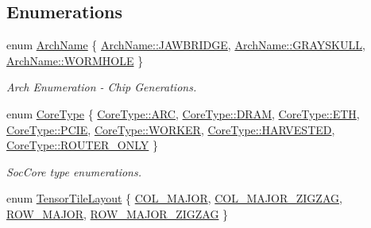 \subsection*{Enumerations}
\begin{DoxyCompactItemize}
\item 
enum \hyperlink{namespacellk_adb2574c7c85c75a2dfaf60853d0863d2}{Arch\+Name} \{ \hyperlink{namespacellk_adb2574c7c85c75a2dfaf60853d0863d2afedde270cf558ea8607564b045a78337}{Arch\+Name\+::\+J\+A\+W\+B\+R\+I\+D\+GE}, 
\hyperlink{namespacellk_adb2574c7c85c75a2dfaf60853d0863d2a876acd7fc1a65f2786b4d75eeed39cbb}{Arch\+Name\+::\+G\+R\+A\+Y\+S\+K\+U\+LL}, 
\hyperlink{namespacellk_adb2574c7c85c75a2dfaf60853d0863d2ab7cfd894e8bd0e909309ff64bb805fa2}{Arch\+Name\+::\+W\+O\+R\+M\+H\+O\+LE}
 \}\begin{DoxyCompactList}\small\item\em Arch Enumeration -\/ Chip Generations. \end{DoxyCompactList}
\item 
enum \hyperlink{namespacellk_ad3e730e596589754342a98abd7021ed4}{Core\+Type} \{ \newline
\hyperlink{namespacellk_ad3e730e596589754342a98abd7021ed4ad72a48a8ebd238e1497a911e938f46e8}{Core\+Type\+::\+A\+RC}, 
\hyperlink{namespacellk_ad3e730e596589754342a98abd7021ed4aebae17841ce69e653df838d8c20ace8d}{Core\+Type\+::\+D\+R\+AM}, 
\hyperlink{namespacellk_ad3e730e596589754342a98abd7021ed4af8d2e1584059489f8ffa3663b3223df2}{Core\+Type\+::\+E\+TH}, 
\hyperlink{namespacellk_ad3e730e596589754342a98abd7021ed4ac0c7fd4fd43dcf7043f237f3819d2863}{Core\+Type\+::\+P\+C\+IE}, 
\newline
\hyperlink{namespacellk_ad3e730e596589754342a98abd7021ed4a531886e636f1aa36e0fc96d49f342613}{Core\+Type\+::\+W\+O\+R\+K\+ER}, 
\hyperlink{namespacellk_ad3e730e596589754342a98abd7021ed4a135edd7964c2e277ee73781835c910aa}{Core\+Type\+::\+H\+A\+R\+V\+E\+S\+T\+ED}, 
\hyperlink{namespacellk_ad3e730e596589754342a98abd7021ed4aa1426080f5aff9d27224e8dd879876c0}{Core\+Type\+::\+R\+O\+U\+T\+E\+R\+\_\+\+O\+N\+LY}
 \}\begin{DoxyCompactList}\small\item\em Soc\+Core type enumerations. \end{DoxyCompactList}
\item 
enum \hyperlink{namespacellk_a1cb439631a4f96e1431eea4d9b1f5cdb}{Tensor\+Tile\+Layout} \{ \hyperlink{namespacellk_a1cb439631a4f96e1431eea4d9b1f5cdba2e0e3da7320c14734283fa14f8325ccc}{C\+O\+L\+\_\+\+M\+A\+J\+OR}, 
\hyperlink{namespacellk_a1cb439631a4f96e1431eea4d9b1f5cdbae821cdf54f59066eb3b7eec07d767162}{C\+O\+L\+\_\+\+M\+A\+J\+O\+R\+\_\+\+Z\+I\+G\+Z\+AG}, 
\hyperlink{namespacellk_a1cb439631a4f96e1431eea4d9b1f5cdba6c2bb79839cbccc8c0df9becfb00d8f8}{R\+O\+W\+\_\+\+M\+A\+J\+OR}, 
\hyperlink{namespacellk_a1cb439631a4f96e1431eea4d9b1f5cdba48f4ef1c077ea476eeef659e85904170}{R\+O\+W\+\_\+\+M\+A\+J\+O\+R\+\_\+\+Z\+I\+G\+Z\+AG}
 \}
\end{DoxyCompactItemize}
